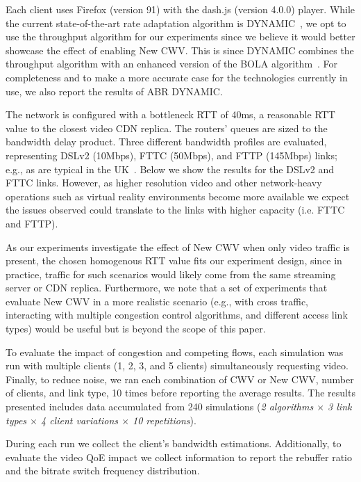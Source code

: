 \documentclass[10pt,sigconf]{acmart}
\begin{document}
Each client uses Firefox (version 91) with the dash.js (version 4.0.0) player. While the current state-of-the-art rate adaptation algorithm is DYNAMIC~\cite{Spiteri-2019-from-theory-to-practice-sabre}, we opt to use the throughput algorithm for our experiments since we believe it would better showcase the effect of enabling New CWV. This is since DYNAMIC combines the throughput algorithm with an enhanced version of the BOLA algorithm~\cite{Spiteri-2016-BOLA}. For completeness and to make a more accurate case for the technologies currently in use, we also report the results of ABR DYNAMIC.

The network is configured with a bottleneck RTT of 40ms, a reasonable RTT value to the closest video CDN replica. The routers' queues are sized to the bandwidth delay product. Three different bandwidth profiles are evaluated, representing DSLv2 (10Mbps), FTTC (50Mbps), and FTTP (145Mbps) links; e.g., as are typical in the UK~\cite{online-ofcom-report}. Below we show the results for the DSLv2 and FTTC links. However, as higher resolution video and other network-heavy operations such as virtual reality environments become more available we expect the issues observed could translate to the links with higher capacity (i.e. FTTC and FTTP).

As our experiments investigate the effect of New CWV when only video traffic is present, the chosen homogenous RTT value fits our experiment design, since in practice, traffic for such scenarios would likely come from the same streaming server or CDN replica. Furthermore, we note that a set of experiments that evaluate New CWV in a more realistic scenario (e.g., with cross traffic, interacting with multiple congestion control algorithms, and different access link types) would be useful but is beyond the scope of this paper.

To evaluate the impact of congestion and competing flows, each simulation was run with multiple clients (1, 2, 3, and 5 clients) simultaneously requesting video. Finally, to reduce noise, we ran each combination of CWV or New CWV, number of clients, and link type, 10 times before reporting the average results. The results presented includes data accumulated from 240 simulations (\emph{2 algorithms $\times$ 3 link types $\times$ 4 client variations $\times$ 10 repetitions}). 

During each run we collect the client's bandwidth estimations. Additionally, to evaluate the video QoE impact we collect information to report the rebuffer ratio and the bitrate switch frequency distribution.
\end{document}
